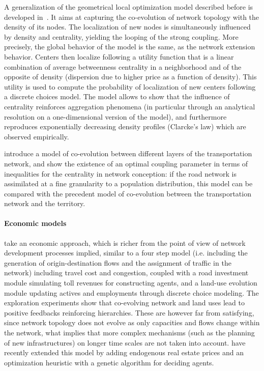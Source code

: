 A generalization of the geometrical local optimization model described before is developed in~\cite{barthelemy2009co}. It aims at capturing the co-evolution of network topology with the density of its nodes. The localization of new nodes is simultaneously influenced by density and centrality, yielding the looping of the strong coupling. More precisely, the global behavior of the model is the same, as the network extension behavior. Centers then localize following a utility function that is a linear combination of average betweenness centrality in a neighborhood and of the opposite of density (dispersion due to higher price as a function of density). This utility is used to compute the probability of localization of new centers following a discrete choices model. The model allows to show that the influence of centrality reinforces aggregation phenomena (in particular through an analytical resolution on a one-dimensional version of the model), and furthermore reproduces exponentially decreasing density profiles (Clarcke's law) which are observed empirically.  


\cite{ding2017heuristic} introduce a model of co-evolution between different layers of the transportation network, and show the existence of an optimal coupling parameter in terms of inequalities for the centrality in network conception: if the road network is assimilated at a fine granularity to a population distribution, this model can be compared with the precedent model of co-evolution between the transportation network and the territory.




\paragraph{Economic models}



\cite{levinson2007co} take an economic approach, which is richer from the point of view of network development processes implied, similar to a four step model (i.e. including the generation of origin-destination flows and the assignment of traffic in the network) including travel cost and congestion, coupled with a road investment module simulating toll revenues for constructing agents, and a land-use evolution module updating actives and employments through discrete choice modeling. The exploration experiments show that co-evolving network and land uses lead to positive feedbacks reinforcing hierarchies. These are however far from satisfying, since network topology does not evolve as only capacities and flows change within the network, what implies that more complex mechanisms (such as the planning of new infrastructures) on longer time scales are not taken into account. \cite{li2016integrated} have recently extended this model by adding endogenous real estate prices and an optimization heuristic with a genetic algorithm for deciding agents.


